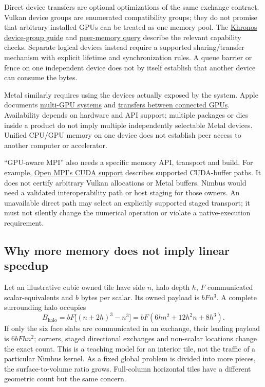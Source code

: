 Direct device transfers are optional optimizations of the same exchange
contract. Vulkan device groups are enumerated compatibility groups; they do
not promise that arbitrary installed GPUs can be treated as one memory pool.
The \href{https://docs.vulkan.org/guide/latest/extensions/device_groups.html}{Khronos
device-group guide} and
\href{https://docs.vulkan.org/refpages/latest/refpages/source/vkGetDeviceGroupPeerMemoryFeatures.html}{peer-memory
query} describe the relevant capability checks. Separate logical devices
instead require a supported sharing/transfer mechanism with explicit lifetime
and synchronization rules. A queue barrier or fence on one independent device
does not by itself establish that another device can consume the bytes.

Metal similarly requires using the devices actually exposed by the system.
Apple documents
\href{https://developer.apple.com/documentation/metal/multi-gpu-systems}{multi-GPU
systems} and
\href{https://developer.apple.com/documentation/metal/transferring-data-between-connected-gpus}{transfers
between connected GPUs}. Availability depends on hardware and API support;
multiple packages or dies inside a product do not imply multiple independently
selectable Metal devices. Unified CPU/GPU memory on one device does not establish
peer access to another computer or accelerator.

``GPU-aware MPI'' also needs a specific memory API, transport and build. For
example, \href{https://docs.open-mpi.org/en/v5.0.8/tuning-apps/networking/cuda.html}{Open
MPI's CUDA support} describes supported CUDA-buffer paths. It does not certify
arbitrary Vulkan allocations or Metal buffers. Nimbus would need a validated
interoperability path or host staging for those owners. An unavailable direct
path may select an explicitly supported staged transport; it must not silently
change the numerical operation or violate a native-execution requirement.

\subsection{Why more memory does not imply linear speedup}

Let an illustrative cubic owned tile have side $n$, halo depth $h$, $F$
communicated scalar-equivalents and $b$ bytes per scalar. Its owned payload is
$bFn^3$. A complete surrounding halo occupies
\[
 B_{\mathrm{halo}}=bF\big[(n+2h)^3-n^3\big]
 =bF(6hn^2+12h^2n+8h^3).
\]
If only the six face slabs are communicated in an exchange, their leading
payload is $6bFhn^2$; corners, staged directional exchanges and non-scalar
locations change the exact count. This is a teaching model for an interior
tile, not the traffic of a particular Nimbus kernel. As a fixed global problem
is divided into more pieces, the surface-to-volume ratio grows. Full-column
horizontal tiles have a different geometric count but the same concern.

